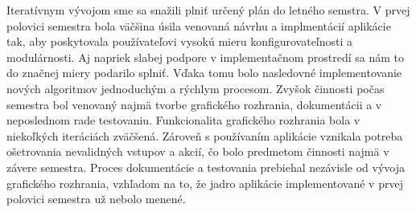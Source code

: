 \documentclass[a4paper,slovak,12pt,appendix]{article}
\begin{document}
\begin{appendices}
\noindent
Iteratívnym vývojom sme sa snažili plniť určený plán do letného semstra. V prvej
polovici semestra bola väčšina úsila venovaná návrhu a implmentácií aplikácie tak,
aby poskytovala používateľovi vysokú mieru konfigurovateľnosti a modulárnosti.
Aj napriek slabej podpore v implementačnom prostredí sa nám to do značnej miery
podarilo splniť. Vďaka tomu bolo nasledovné implementovanie nových algoritmov
jednoduchým a rýchlym procesom. Zvyšok činnosti počas semestra bol venovaný
najmä tvorbe grafického rozhrania, dokumentácii a v neposlednom rade testovaniu.
Funkcionalita grafického rozhrania bola v niekoľkých iteráciách zväčšená.
Zároveň s používaním aplikácie vznikala potreba ošetrovania nevalidných vstupov
a akcií, čo bolo predmetom činnosti najmä v závere semestra. Proces
dokumentácie a testovania prebiehal nezávisle od vývoja grafického rozhrania,
vzhľadom na to, že jadro aplikácie implementované v prvej polovici semestra už
nebolo menené.

\end{appendices}
\end{document}
